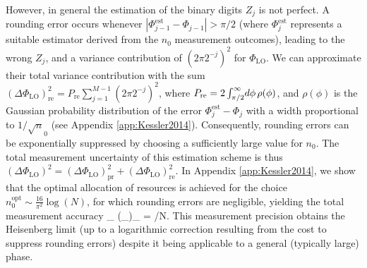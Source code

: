 However, in general the estimation of the binary digits $Z_j$ is not perfect.
A rounding error occurs whenever $|\Phi_{j-1}^\mathrm{est} - \Phi_{j-1}| > \pi/2$
(where $\Phi_j^\mathrm{est}$ represents a suitable estimator derived from the $n_0$
measurement outcomes), leading to the wrong $Z_j$, and a variance contribution
of $(2\pi 2^{-j})^2$ for $\Phi_\mathrm{LO}$.
We can approximate their total
variance contribution with the sum
 $ 	(\Delta\Phi_\mathrm{LO})^2_\mathrm{re} = P_\mathrm{re}\sum_{j=1}^{M-1}
 	(2\pi 2^{-j})^2
 $, where 
$P_\mathrm{re} = 2\intop_{\pi/2}^{\infty}\d{\phi}
\rho(\phi)$, 
and $\rho(\phi)$ is the Gaussian probability distribution of the error
$\Phi_j^\mathrm{est} - \Phi_j$ with a width proportional to $1/\sqrt n_0$  
(see Appendix \ref{app:Kessler2014}).
Consequently, rounding errors can be exponentially suppressed by choosing a
sufficiently large value for $n_0$. The total
measurement uncertainty of this estimation scheme is thus
$(\Delta\Phi_\mathrm{LO})^2 = (\Delta\Phi_\mathrm{LO})_\mathrm{pr}^2
+(\Delta\Phi_\mathrm{LO})_\mathrm{re}^2$.
In Appendix \ref{app:Kessler2014}, we show that the optimal allocation of
resources is achieved for the choice $n_{0}^{\mathrm{opt}} \sim
\frac{16}{\pi^2}\log\left(N\right)$, for which rounding errors are negligible,
yielding the total measurement accuracy
 \bel
 \label{eq:M}
\Delta\Phi_ \approx (\Delta\Phi_)_ =
/N.
\eel This measurement precision obtains the Heisenberg limit (up to a
logarithmic correction resulting from the cost to suppress rounding errors)
despite it being applicable to a general (typically large) phase.


